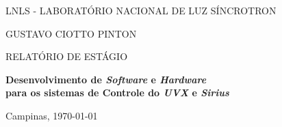 \begin{center}


\vspace*{12pt}

LNLS - LABORATÓRIO NACIONAL DE LUZ SÍNCROTRON

\vspace*{.30\textheight}

{\Large GUSTAVO CIOTTO PINTON}

\vspace*{72pt}

RELATÓRIO DE ESTÁGIO

\vspace{12pt}

\textbf{\Large Desenvolvimento de \textit{Software} e \textit{Hardware} \\ para
os sistemas de Controle do \textit{UVX} e \textit{Sirius}} \\ \vspace{12pt}

\vspace*{.38\textheight}
 
Campinas, \today

\end{center}

\newpage 
